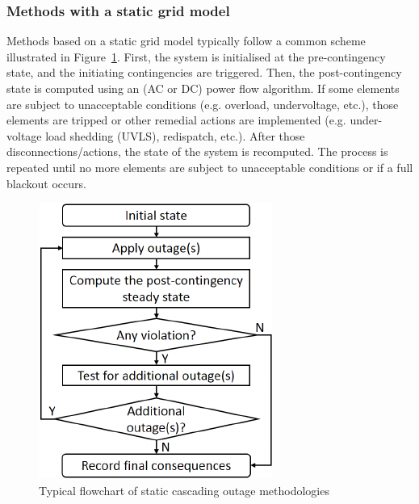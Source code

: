\subsubsection{Methods with a static grid model}
\label{sec:QSSmethods}

Methods based on a static grid model typically follow a common scheme illustrated in Figure~\ref{fig:QSS_flowchart}. First, the system is initialised at the pre-contingency state, and the initiating contingencies are triggered. Then, the post-contingency state is computed using an (AC or DC) power flow algorithm. If some elements are subject to unacceptable conditions (e.g. overload, undervoltage, etc.), those elements are tripped or other remedial actions are implemented (e.g. under-voltage load shedding (UVLS), redispatch, etc.). After those disconnections/actions, the state of the system is recomputed. The process is repeated until no more elements are subject to unacceptable conditions or if a full blackout occurs.

\begin{figure}
    \centering
    \includegraphics[width=0.4\linewidth]{Figs/QSS_flowchart.pdf}
    \caption{Typical flowchart of static cascading outage methodologies~\cite{Benchmarking2018}}
    \label{fig:QSS_flowchart}
\end{figure}

